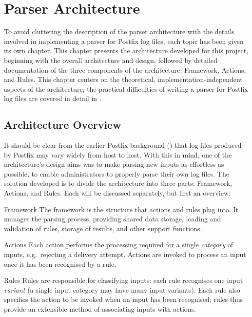 \chapter{Parser Architecture}

\label{parser architecture}

To avoid cluttering the description of the parser architecture with the
details involved in implementing a parser for Postfix log files, each topic
has been given its own chapter.  This chapter presents the architecture
developed for this project, beginning with the overall architecture and
design, followed by detailed documentation of the three components of the
architecture: Framework, Actions, and Rules.  This chapter centers on the
theoretical, implementation-independent aspects of the architecture; the
practical difficulties of writing a parser for Postfix log files are
covered in detail in .

\section{Architecture Overview}

\label{parser design}

It should be clear from the earlier Postfix background () that log files produced by Postfix may vary widely from host
to host.  With this in mind, one of the architecture's design aims was to
make parsing new inputs as effortless as possible, to enable administrators
to properly parse their own log files.  The solution developed is to divide
the architecture into three parts: Framework, Actions, and Rules.  Each
will be discussed separately, but first an overview:

\begin{boldeqlist}

    \item [Framework]  The framework is the structure that actions and
        rules plug into.  It manages the parsing process, providing shared
        data storage, loading and validation of rules, storage of results,
        and other support functions.

    \item [Actions] Each action performs the processing required for a
        single \textit{category\/} of inputs, e.g.\ rejecting a delivery
        attempt.  Actions are invoked to process an input once it has been
        recognised by a rule.

    \item [Rules]  Rules are responsible for classifying inputs: each rule
        recognises one input \textit{variant\/} (a single input category
        may have many input variants).  Each rule also specifies the action
        to be invoked when an input has been recognised; rules thus provide
        an extensible method of associating inputs with actions.

\end{boldeqlist}

